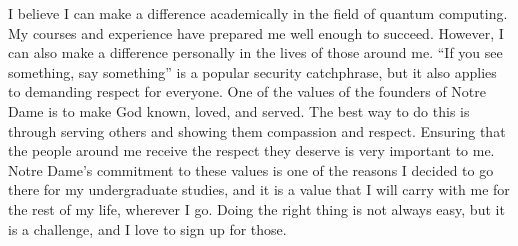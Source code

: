 {    I believe I can make a difference academically in the field of quantum
    computing. My courses and experience have prepared me well enough to
    succeed. However, I can also make a difference personally in the lives of
    those around me. ``If you see something, say something'' is a popular
    security catchphrase, but it also applies to demanding respect for
    everyone. One of the values of the founders of Notre Dame is to make God
    known, loved, and served. The best way to do this is through serving others
    and showing them compassion and respect. Ensuring that the people around me
    receive the respect they deserve is very important to me.  Notre Dame's
    commitment to these values is one of the reasons I decided to go there 
    for my undergraduate studies, and it is a value that I will carry with me
    for the rest of my life, wherever I go. Doing the right thing is not always
    easy, but it is a challenge, and I love to sign up for those.
}

